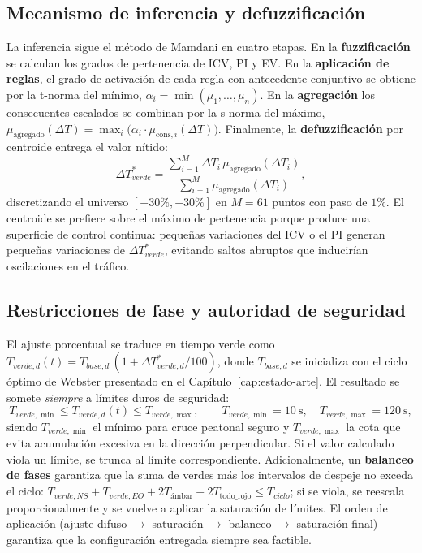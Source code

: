 \subsection{Mecanismo de inferencia y defuzzificación}\label{subsec:fuzzy-inferencia}

La inferencia sigue el método de Mamdani en cuatro etapas. En la \textbf{fuzzificación} se
calculan los grados de pertenencia de ICV, PI y EV. En la \textbf{aplicación de reglas}, el
grado de activación de cada regla con antecedente conjuntivo se obtiene por la t-norma del
mínimo, $\alpha_i=\min(\mu_{1},\ldots,\mu_{n})$. En la \textbf{agregación} los consecuentes
escalados se combinan por la s-norma del máximo,
$\mu_{\text{agregado}}(\Delta T)=\max_i\big(\alpha_i\cdot\mu_{\text{cons},i}(\Delta T)\big)$.
Finalmente, la \textbf{defuzzificación} por centroide entrega el valor nítido:
\[
\Delta T_{verde}^{*}=
\frac{\sum_{i=1}^{M}\Delta T_i\,\mu_{\text{agregado}}(\Delta T_i)}
     {\sum_{i=1}^{M}\mu_{\text{agregado}}(\Delta T_i)},
\]
discretizando el universo $[-30\%,+30\%]$ en $M=61$ puntos con paso de $1\%$. El centroide se
prefiere sobre el máximo de pertenencia porque produce una superficie de control continua:
pequeñas variaciones del ICV o el PI generan pequeñas variaciones de $\Delta T_{verde}^{*}$,
evitando saltos abruptos que inducirían oscilaciones en el tráfico.

\subsection{Restricciones de fase y autoridad de seguridad}\label{subsec:fuzzy-seguridad}

El ajuste porcentual se traduce en tiempo verde como
$T_{verde,d}(t)=T_{base,d}\,(1+\Delta T_{verde,d}^{*}/100)$, donde $T_{base,d}$ se inicializa
con el ciclo óptimo de Webster presentado en el Capítulo~\ref{cap:estado-arte}. El resultado se
somete \emph{siempre} a límites duros de seguridad:
\[
T_{verde,\min}\le T_{verde,d}(t)\le T_{verde,\max},
\qquad T_{verde,\min}=10\ \text{s},\quad T_{verde,\max}=120\ \text{s},
\]
siendo $T_{verde,\min}$ el mínimo para cruce peatonal seguro y $T_{verde,\max}$ la cota que
evita acumulación excesiva en la dirección perpendicular. Si el valor calculado viola un
límite, se trunca al límite correspondiente. Adicionalmente, un \textbf{balanceo de fases}
garantiza que la suma de verdes más los intervalos de despeje no exceda el ciclo:
$T_{verde,NS}+T_{verde,EO}+2T_{\text{ámbar}}+2T_{\text{todo\_rojo}}\le T_{ciclo}$; si se viola,
se reescala proporcionalmente y se vuelve a aplicar la saturación de límites. El orden de
aplicación (ajuste difuso $\rightarrow$ saturación $\rightarrow$ balanceo $\rightarrow$
saturación final) garantiza que la configuración entregada siempre sea factible.

